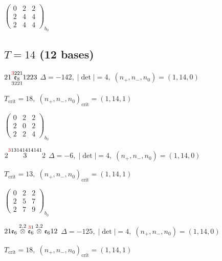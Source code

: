 \documentclass[10pt]{article}
\begin{document}
\hspace{2em}$\left(\begin{smallmatrix}0 & 2 & 2 \\ 2 & 4 & 4 \\ 2 & 4 & 4\end{smallmatrix}\right)_{\!b_0}$


\subsection*{$T = 14$ \quad (12 bases)}
\smallskip

$21\overset{\textcolor{red}{3}221}{\underset{3221}{\mathfrak{e}_8}}1223$ \quad $\Delta=-142,\; |\det|=4,\; (n_+,n_-,n_0)=(1,14,0)$

\hspace{1em}$T_{\text{crit}}=18,\; (n_+,n_-,n_0)_{\text{crit}}=(1,14,1)$

\hspace{2em}$\left(\begin{smallmatrix}0 & 2 & 2 \\ 2 & 0 & 2 \\ 2 & 2 & 4\end{smallmatrix}\right)_{\!b_0}$

\smallskip

$2\overset{\textcolor{red}{3}13141414141}{3}2$ \quad $\Delta=-6,\; |\det|=4,\; (n_+,n_-,n_0)=(1,14,0)$

\hspace{1em}$T_{\text{crit}}=13,\; (n_+,n_-,n_0)_{\text{crit}}=(1,14,1)$

\hspace{2em}$\left(\begin{smallmatrix}0 & 2 & 2 \\ 2 & 5 & 7 \\ 2 & 7 & 9\end{smallmatrix}\right)_{\!b_0}$

\smallskip

$21\mathfrak{e}_6\overset{2,2}{\otimes}\overset{\textcolor{red}{3}1}{\mathfrak{e}_6}\overset{2,2}{\otimes}\mathfrak{e}_612$ \quad $\Delta=-125,\; |\det|=4,\; (n_+,n_-,n_0)=(1,14,0)$

\hspace{1em}$T_{\text{crit}}=18,\; (n_+,n_-,n_0)_{\text{crit}}=(1,14,1)$
\end{document}

